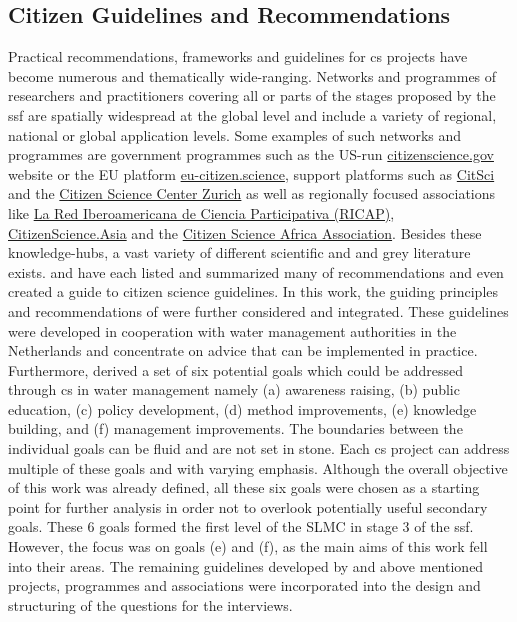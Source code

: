 \subsection{Citizen Guidelines and Recommendations}

Practical recommendations, frameworks and guidelines for \acrlong*{cs} projects have become numerous and thematically wide-ranging. Networks and programmes of researchers and practitioners covering all or parts of the stages proposed by the \acrshort*{ssf} are spatially widespread at the global level and include a variety of regional, national or global application levels. Some examples of such networks and programmes are government programmes such as the US-run \href{https://www.citizenscience.gov/}{citizenscience.gov} website or the EU platform \href{https://eu-citizen.science/}{eu-citizen.science}, support platforms such as \href{https://citsci.org/}{CitSci} and the \href{https://citizenscience.ch/en/}{Citizen Science Center Zurich} as well as regionally focused associations like \href{http://cienciaparticipativa.net/la-ricap/}{La Red Iberoamericana de Ciencia Participativa (RICAP)}, \href{https://citizenscience.asia/}{CitizenScience.Asia} and the \href{https://www.usiu.ac.ke/citsci-africa-association/}{Citizen Science Africa Association}.\newline
Besides these knowledge-hubs, a vast variety of different scientific and and grey literature exists. \autocite{fraislCitizenScienceEnvironmental2022} and \autocite{westonCommunityBasedWaterMonitoring2015} have each listed and summarized many of recommendations and \autocite{garciaFindingWhatYou2021} even created a guide to citizen science guidelines. In this work, the guiding principles and recommendations of \autocite{minkmanCitizenScienceWater2015} were further considered and integrated. These guidelines were developed in cooperation with water management authorities in the Netherlands and concentrate on advice that can be implemented in practice. Furthermore, \autocite{minkmanCitizenScienceWater2015} derived a set of six potential goals which could be addressed through \acrlong*{cs} in water management namely (a) awareness raising, (b) public education, (c) policy development, (d) method improvements, (e) knowledge building, and (f) management improvements. The boundaries between the individual goals can be fluid and are not set in stone. Each \acrshort*{cs} project can address multiple of these goals and with varying emphasis. Although the overall objective of this work was already defined, all these six goals were chosen as a starting point for further analysis in order not to overlook potentially useful secondary goals. These 6 goals formed the first level of the SLMC in stage 3 of the \acrshort*{ssf}. However, the focus was on goals (e) and (f), as the main aims of this work fell into their areas. The remaining guidelines developed by \autocite{minkmanCitizenScienceWater2015} and above mentioned projects, programmes and associations were incorporated into the design and structuring of the questions for the interviews.
